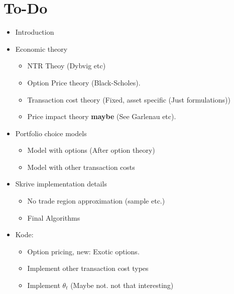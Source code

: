 \documentclass[11pt]{article}
\begin{document}
\section{To-Do}\label{sec:To-Do}
\begin{itemize}
  \item Introduction
  \item Economic theory
      \begin{itemize}
        \item NTR Theoy (Dybvig etc)
        \item Option Price theory (Black-Scholes). 
        \item Transaction cost theory (Fixed, asset specific (Just formulations))
        \item Price impact theory \textbf{maybe} (See Garlenau etc).
      \end{itemize}
  \item Portfolio choice models
      \begin{itemize}
        \item Model with options (After option theory)
        \item Model with other transaction costs
      \end{itemize}
  \item Skrive implementation details
      \begin{itemize}
        \item No trade region approximation (sample etc.)
        \item Final Algorithms 
      \end{itemize}
  \item Kode:
    \begin{itemize}
      \item Option pricing, new: Exotic options.
      \item Implement other transaction cost types
      \item Implement $\theta_t$ (Maybe not. not that interesting)
    \end{itemize}  
\end{itemize}








\newpage

\begingroup 
  \hypersetup{linkcolor=black}

  \hypersetup{
    colorlinks=true,
    citecolor=black,
    linkcolor=black,
    filecolor=black, 
    urlcolor=black}
  \printbibliography
\endgroup

\newpage


\end{document}
